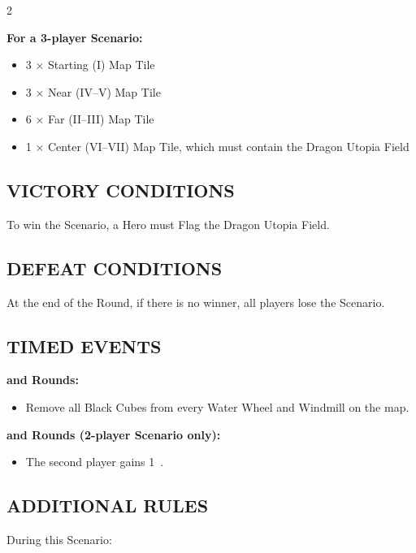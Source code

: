 \begin{multicols*}{2}
\columnbreak

\textbf{For a 3-player Scenario:}
\begin{itemize}
  \item 3 × Starting (I) Map Tile
  \item 3 × Near (IV--V) Map Tile
  \item 6 × Far (II--III) Map Tile
  \item 1 × Center (VI--VII) Map Tile, which must contain the Dragon Utopia Field
\end{itemize}

\subsection*{\MakeUppercase{Victory Conditions}}
To win the Scenario, a Hero must Flag the Dragon Utopia Field.

\subsection*{\MakeUppercase{Defeat Conditions}}
At the end of the  Round, if there is no winner, all players lose the Scenario.

\subsection*{\MakeUppercase{Timed Events}}

\textbf{ and  Rounds:}
\begin{itemize}
  \item Remove all Black Cubes from every Water Wheel and Windmill on the map.
\end{itemize}

\textbf{ and  Rounds (2-player Scenario only):}
\begin{itemize}
  \item The second player gains 1~.
\end{itemize}

\subsection*{\MakeUppercase{Additional Rules}}

During this Scenario:


\end{multicols*}
